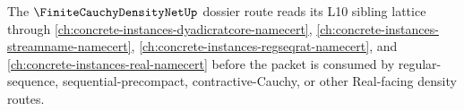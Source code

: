 The $\FiniteCauchyDensityNetUp$ dossier route reads its L10 sibling lattice through \autoref{ch:concrete-instances-dyadicratcore-namecert}, \autoref{ch:concrete-instances-streamname-namecert}, \autoref{ch:concrete-instances-regseqrat-namecert}, and \autoref{ch:concrete-instances-real-namecert} before the packet is consumed by regular-sequence, sequential-precompact, contractive-Cauchy, or other Real-facing density routes.
